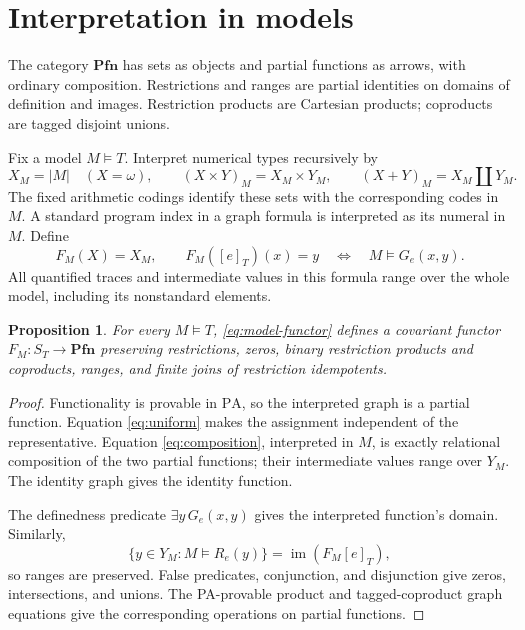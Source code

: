 \documentclass[11pt]{article}
\newtheorem{proposition}[theorem]{Proposition}
\newcommand{\PA}{\mathrm{PA}}
\newcommand{\Pfn}{\mathbf{Pfn}}
\begin{document}
\section{Interpretation in models}\label{sec:models}

The category $\Pfn$ has sets as objects and partial functions as arrows,
with ordinary composition. Restrictions and ranges are partial identities
on domains of definition and images. Restriction products are Cartesian products;
coproducts are tagged disjoint unions.

Fix a model $M\models T$. Interpret numerical types recursively by
\[
 X_M=|M|\quad(X=\omega),\qquad
 (X\times Y)_M=X_M\times Y_M,\qquad
 (X+Y)_M=X_M\amalg Y_M.
\]
The fixed arithmetic codings identify these sets with the corresponding
codes in $M$. A standard program index in a graph formula is interpreted
as its numeral in $M$. Define
\begin{equation}\label{eq:model-functor}
 F_M(X)=X_M,\qquad
 F_M([e]_T)(x)=y
 \quad\Longleftrightarrow\quad M\models G_e(x,y).
\end{equation}
All quantified traces and intermediate values in this formula range over
the whole model, including its nonstandard elements.

\begin{proposition}\label{prop:model}
For every $M\models T$, \eqref{eq:model-functor} defines a covariant
functor $F_M:S_T\to\Pfn$ preserving restrictions, zeros, binary
restriction products and coproducts, ranges, and finite joins of
restriction idempotents.
\end{proposition}
\begin{proof}
Functionality is provable in $\PA$, so the interpreted graph is a
partial function. Equation \eqref{eq:uniform} makes the assignment
independent of the representative. Equation \eqref{eq:composition},
interpreted in $M$, is exactly relational composition of the two partial
functions; their intermediate values range over $Y_M$. The identity
graph gives the identity function.

The definedness predicate $\exists y\,G_e(x,y)$ gives the interpreted
function's domain. Similarly,
\[
 \{y\in Y_M:M\models R_e(y)\}
 =\operatorname{im}(F_M[e]_T),
\]
so ranges are preserved. False predicates, conjunction, and disjunction
give zeros, intersections, and unions. The PA-provable product and
tagged-coproduct graph equations give the corresponding operations on
partial functions.
\end{proof}
\end{document}
